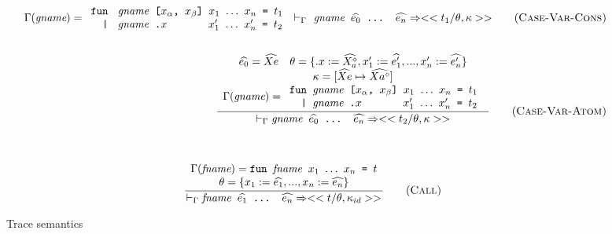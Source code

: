 \documentclass[10pt]{../sigplanconf}
\newcommand{\nfrac}[2]{\frac{\displaystyle{#1}}{\displaystyle{#2}}}
\newcommand{\tagsc}[1]{\tag{\scshape #1}}
\begin{document}
\begin{figure}
\begin{align}
{\begin{array}{c}
        \Gamma(\textit{gname}) =
        \begin{array}{l}
          \texttt{fun \textit{\rmfamily gname} [$x_\alpha$, $x_\beta$] $x_1$ $\ldots$ $x_n$ = $t_1$} \\
          \texttt{\ \ | \textit{\rmfamily gname}\ \texttt{.}$x$ \hspace{0.95cm} $x_1'$ $\ldots$ $x_n'$ = $t_2$} \\
        \end{array}
      \end{array}
    }{
      |-_\Gamma \texttt{\textit{\rmfamily gname} $\widehat{e_0}$ ... $\widehat{e_n}$} => <<t_1 / \theta, \kappa>>
    } \tagsc{Case-Var-Cons}
\\\nonumber\\
    \nfrac{
      \begin{array}{c}
        \widehat{e_0} = \widehat{Xe} \quad \theta = \{ .x := \widehat{X_{a}^\diamond}, x_1' := \widehat{e_1'}, ..., x_n' := \widehat{e_n'} \} \\
        \kappa = [\widehat{Xe} \mapsto \widehat{Xa^\diamond}] \\
        \Gamma(\textit{gname}) =
        \begin{array}{l}
          \texttt{fun \textit{\rmfamily gname} [$x_\alpha$, $x_\beta$] $x_1$ $\ldots$ $x_n$ = $t_1$} \\
          \texttt{\ \ | \textit{\rmfamily gname}\ \texttt{.}$x$ \hspace{0.95cm} $x_1'$ $\ldots$ $x_n'$ = $t_2$} \\
        \end{array}
      \end{array}
    }{
      |-_\Gamma \texttt{\textit{\rmfamily gname} $\widehat{e_0}$ ... $\widehat{e_n}$} => <<t_2 / \theta, \kappa>>
    } \tagsc{Case-Var-Atom}
  \end{align}

  ~\newline

  \begin{equation}
    \nfrac{
      \begin{array}{c}
        \Gamma(\textit{fname}) =
          \texttt{fun \textit{\rmfamily fname} $x_1$ $\ldots$ $x_n$ = $t$} \\
        \theta = \{ x_1 := \widehat{e_1}, ..., x_n := \widehat{e_n} \}
      \end{array}
    }{
      |-_\Gamma \texttt{\textit{\rmfamily fname} $\widehat{e_1}$ ... $\widehat{e_n}$} => <<t / \theta, \kappa_{id}>>
    } \tagsc{Call}
  \end{equation}

  \caption{Trace semantics}
  \label{fig:tracing}
\end{figure}
\end{document}
